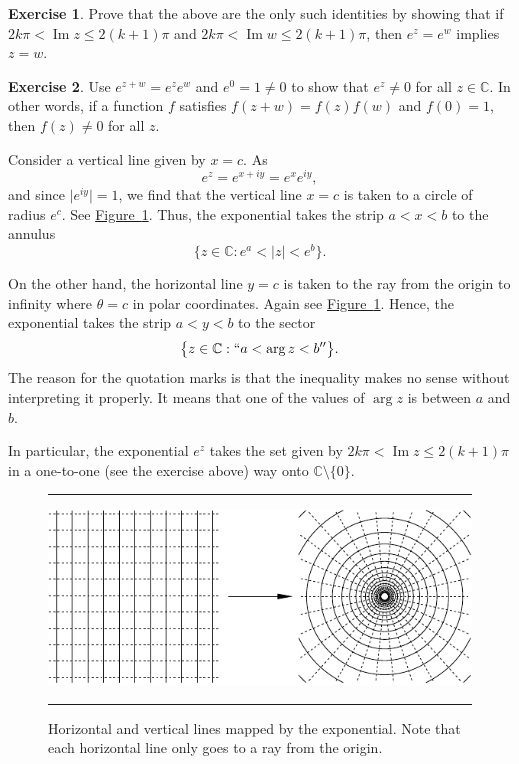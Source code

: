 \documentclass[12pt,openany]{book}
\renewcommand{\Im}{\operatorname{Im}}
\newcommand{\sabs}[1]{\lvert {#1} \rvert}
\newcommand{\C}{{\mathbb{C}}}
\theoremstyle{plain}
\theoremstyle{remark}
\theoremstyle{definition}
\newenvironment{exbox}{%
    \def\FrameCommand{\vrule width 1pt \relax\hspace {10pt}}%
    \MakeFramed {\advance \hsize -\width \FrameRestore }%
}{%
    \endMakeFramed
}
\newenvironment{myfig}{%
\begin{figure}[h!t]
\noindent\rule{\textwidth}{0.4pt}\vspace{12pt}\par\centering}%
{\par\noindent\rule{\textwidth}{0.4pt}
\end{figure}}
\theoremstyle{exercise}
\newtheorem{exercise}{Exercise}[section]
\theoremstyle{example}
\newcommand{\figureref}[1]{\hyperref[#1]{Figure~\ref*{#1}}}
\begin{document}
\begin{exbox}
\begin{exercise}
Prove that the above are the only such identities by
showing that if $2k\pi < \Im z \leq 2(k+1)\pi$ and
$2k\pi < \Im w \leq 2(k+1)\pi$, then $e^z=e^w$ implies $z=w$.
\end{exercise}

\begin{exercise}
Use $e^{z+w} = e^z e^w$ and $e^0 = 1 \not= 0$ to show that $e^z \not=0$ for all
$z \in \C$.  In other words, if a function $f$ satisfies $f(z+w)=f(z)f(w)$
and $f(0) = 1$, then $f(z) \not= 0$ for all $z$.
\end{exercise}
\end{exbox}

Consider a vertical line given by $x=c$.  As
\begin{equation*}
e^{z} = 
e^{x+iy} =
e^x e^{iy} ,
\end{equation*}
and since $\sabs{e^{iy}} =1$, we find that the vertical line $x=c$ is taken to a
circle of radius $e^c$.  See \figureref{fig:expplotlines}.
Thus, the exponential takes the strip $a < x < b$ to the
annulus
\begin{equation*}
\bigl\{ z \in \C : e^a < \sabs{z} < e^b \bigr\} .
\end{equation*}

On the other hand, the horizontal line $y=c$
is taken to the ray from the origin to infinity where $\theta = c$ in polar
coordinates.  Again see \figureref{fig:expplotlines}.
Hence, the exponential takes the strip $a < y < b$ to the
sector
\begin{equation*}
\bigl\{ z \in \C : ``a < \arg z < b'' \bigr\} .
\end{equation*}
The reason for the quotation marks is that the inequality makes no
sense without interpreting it properly.  It means that one of the values
of $\arg z$ is between $a$ and $b$.

In particular, the exponential $e^z$ takes the set given by
$2k\pi < \Im z \leq 2(k+1)\pi$ in a one-to-one (see the exercise above)
way onto $\C \setminus \{ 0 \}$.

\begin{myfig}
\includegraphics{figures/expplotlines}
\caption{Horizontal and vertical lines mapped by the exponential.  Note that
each horizontal line only goes to a ray from the
origin.\label{fig:expplotlines}}
\end{myfig}
\end{document}
